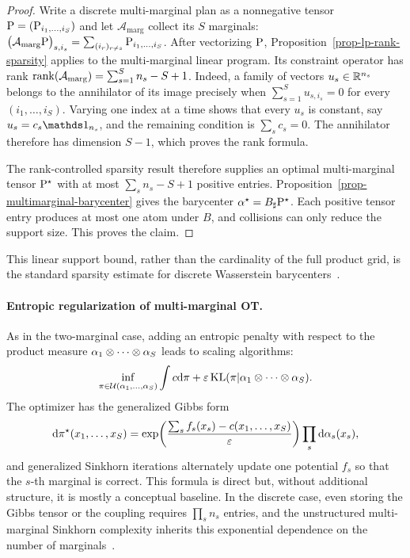 \begin{proof}
	Write a discrete multi-marginal plan as a nonnegative tensor
	$\P=(\P_{i_1,\ldots,i_S})$ and let $\mathcal A_{\mathrm{marg}}$ collect its $S$ marginals:
	$\bigl(\mathcal A_{\mathrm{marg}}\P\bigr)_{s,i_s} = \sum_{(i_r)_{r\neq s}}\P_{i_1,\ldots,i_S}$.
	After vectorizing $\P$, Proposition~\ref{prop-lp-rank-sparsity} applies to the multi-marginal linear program. Its constraint operator has rank
	$\rank(\mathcal A_{\mathrm{marg}}) = \sum_{s=1}^S n_s-S+1$.
	Indeed, a family of vectors $u_s\in\RR^{n_s}$ belongs to the annihilator of its image precisely when
	$\sum_{s=1}^S u_{s,i_s}=0$ for every $(i_1,\ldots,i_S)$.
	Varying one index at a time shows that every $u_s$ is constant, say $u_s=c_s\ones_{n_s}$, and the remaining condition is $\sum_s c_s=0$. The annihilator therefore has dimension $S-1$, which proves the rank formula.

	The rank-controlled sparsity result therefore supplies an optimal multi-marginal tensor $\P^\star$ with at most $\sum_s n_s-S+1$ positive entries. Proposition~\ref{prop-multimarginal-barycenter} gives the barycenter $\al^\star=B_\sharp\P^\star$. Each positive tensor entry produces at most one atom under $B$, and collisions can only reduce the support size. This proves the claim.
\end{proof}

This linear support bound, rather than the cardinality of the full product grid, is the standard sparsity estimate for discrete Wasserstein barycenters~\cite{anderes2016discrete}.

\paragraph{Entropic regularization of multi-marginal OT.}

As in the two-marginal case, adding an entropic penalty with respect to the product measure $\al_1\otimes\cdots\otimes\al_S$ leads to scaling algorithms:
\[
	\inf_{\pi\in\Couplings(\al_1,\ldots,\al_S)}
	\int c\d\pi+\epsilon\KL(\pi|\al_1\otimes\cdots\otimes\al_S).
\]
The optimizer has the generalized Gibbs form
\[
	\d\pi^\star(x_1,\ldots,x_S)
	=
	\exp\!\left(\frac{\sum_s f_s(x_s)-c(x_1,\ldots,x_S)}{\epsilon}\right)
	\prod_s\d\al_s(x_s),
\]
and generalized Sinkhorn iterations alternately update one potential $f_s$ so that the $s$-th marginal is correct. This formula is direct but, without additional structure, it is mostly a conceptual baseline. In the discrete case, even storing the Gibbs tensor or the coupling requires $\prod_s n_s$ entries, and the unstructured multi-marginal Sinkhorn complexity inherits this exponential dependence on the number of marginals~\cite{LinHoCuturiJordan2022MOTComplexity}.

